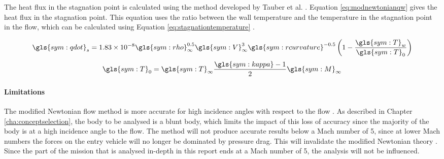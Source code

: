 The heat flux in the stagnation point is calculated using the method developed by Tauber et al. \cite{Tauber1986}. Equation \ref{eq:modnewtonianqw} gives the heat flux in the stagnation point. This equation uses the ratio between the wall temperature and the temperature in the stagnation point in the flow, which can be calculated using Equation \ref{eq:stagnationtemperature} \cite{AndersonJr.2006}.


	\begin{equation} \label{eq:modnewtonianqw}
		\gls{sym:qdot}_{s} = 1.83 \times 10^{-8} \gls{sym:rho}_{\infty}^{0.5} \gls{sym:V}_{\infty}^3  \gls{sym:rcurvature}^{-0.5} \left(1-\frac{\gls{sym:T}_{w}}{\gls{sym:T}_0}\right)
	\end{equation} \break
	\begin{equation}
		\gls{sym:T}_0 = \gls{sym:T}_\infty \frac{\gls{sym:kappa}-1}{2}\gls{sym:M}_\infty
		\label{eq:stagnationtemperature}
	\end{equation}
	


\paragraph{Limitations}
The modified Newtonian flow method is more accurate for high incidence angles with respect to the flow \cite{AndersonJr.2006}. As described in Chapter \ref{cha:conceptselection}, the body to be analysed is a blunt body, which limits the impact of this loss of accuracy since the majority of the body is at a high incidence angle to the flow. The method will not produce accurate results below a Mach number of 5, since at lower Mach numbers the forces on the entry vehicle will no longer be dominated by pressure drag. This will invalidate the modified Newtonian theory \cite{AndersonJr.2006}.
Since the part of the mission that is analysed in-depth in this report ends at a Mach number of 5, the analysis will not be influenced.

